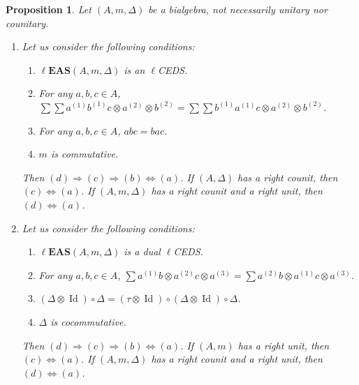 \documentclass[pdftex]{sigma}
\numberwithin{equation}{section}
\newtheorem{Proposition}[Theorem]{Proposition}
 { \theoremstyle{definition}
\newtheorem{Definition}[Theorem]{Definition}
\newtheorem{Note}[Theorem]{Note}
\newtheorem{Example}[Theorem]{Example}
\newtheorem{Remark}[Theorem]{Remark}
\newtheorem{Notation}[Theorem]{Notation}}
\newcommand{\leas}{\ell\mathbf{EAS}}
\begin{document}
\begin{Proposition}\label{prop5.2}
Let $(A,m,\Delta)$ be a bialgebra, not necessarily unitary nor counitary.
\begin{enumerate}\itemsep=0pt
\item[$(1)$] Let us consider the following conditions:
\begin{enumerate}\itemsep=0pt
\item[$(a)$] $\leas(A,m,\Delta)$ is an $\ell$CEDS.
\item[$(b)$] For any $a,b,c\in A$, $\sum \sum a^{(1)}b^{(1)}c\otimes a^{(2)}\otimes b^{(2)}=\sum \sum b^{(1)}a^{(1)}c\otimes a^{(2)}\otimes b^{(2)}$.
\item[$(c)$] For any $a,b,c\in A$, $abc=bac$.
\item[$(d)$] $m$ is commutative.
\end{enumerate}
Then $(d)\Longrightarrow (c)\Longrightarrow (b)\Longleftrightarrow (a)$. If $(A,\Delta)$ has a right counit, then $(c)\Longleftrightarrow (a)$. If $(A,m,\Delta)$ has a right counit and a right unit, then $(d)\Longleftrightarrow (a)$.
\item[$(2)$] Let us consider the following conditions:
\begin{enumerate}\itemsep=0pt
\item[$(a)$] $\leas(A,m,\Delta)$ is a dual $\ell$CEDS.
\item[$(b)$] For any $a,b,c\in A$,
$\sum a^{(1)}b\otimes a^{(2)}c\otimes a^{(3)}=\sum a^{(2)}b\otimes a^{(1)}c \otimes a^{(3)}$.
\item[$(c)$] $(\Delta \otimes \operatorname{Id})\circ \Delta=(\tau \otimes \operatorname{Id})\circ (\Delta \otimes \operatorname{Id})\circ \Delta$.
\item[$(d)$] $\Delta$ is cocommutative.
\end{enumerate}
Then $(d)\Longrightarrow (c)\Longrightarrow (b)\Longleftrightarrow (a)$. If $(A,m)$ has a right unit, then $(c)\Longleftrightarrow (a)$. If $(A,m,\Delta)$ has a right counit and a right unit, then $(d)\Longleftrightarrow (a)$.
\end{enumerate}
\end{Proposition}
\end{document}
